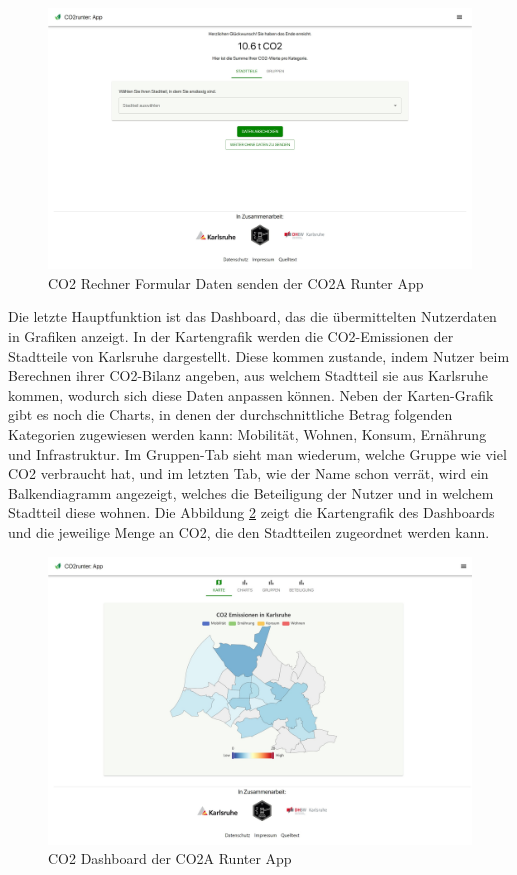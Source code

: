 \begin{figure}[h]
    \centering
    \includegraphics[width=1\textwidth]{images/02/CO2-Runter-App-Daten-Senden.jpeg}
    \caption{CO2 Rechner Formular Daten senden der CO2A Runter App}
    \label{fig:co2runterapp-send}
\end{figure}

Die letzte Hauptfunktion ist das Dashboard, das die übermittelten Nutzerdaten in Grafiken anzeigt. In der Kartengrafik werden die CO2-Emissionen der Stadtteile von Karlsruhe dargestellt. Diese kommen zustande, indem Nutzer beim Berechnen ihrer CO2-Bilanz angeben, aus welchem Stadtteil sie aus Karlsruhe kommen, wodurch sich diese Daten anpassen können. Neben der Karten-Grafik gibt es noch die Charts, in denen der durchschnittliche Betrag folgenden Kategorien zugewiesen werden kann: Mobilität, Wohnen, Konsum, Ernährung und Infrastruktur. Im Gruppen-Tab sieht man wiederum, welche Gruppe wie viel CO2 verbraucht hat, und im letzten Tab, wie der Name schon verrät, wird ein Balkendiagramm angezeigt, welches die Beteiligung der Nutzer und in welchem Stadtteil diese wohnen. Die Abbildung \ref{fig:co2runterapp-dashboard} zeigt die Kartengrafik des Dashboards und die jeweilige Menge an CO2, die den Stadtteilen zugeordnet werden kann.

\newpage

\begin{figure}[h]
    \centering
    \includegraphics[width=1\textwidth]{images/02/CO2-Runter-App-Dashboard.jpeg}
    \caption{CO2 Dashboard der CO2A Runter App}
    \label{fig:co2runterapp-dashboard}
\end{figure}

